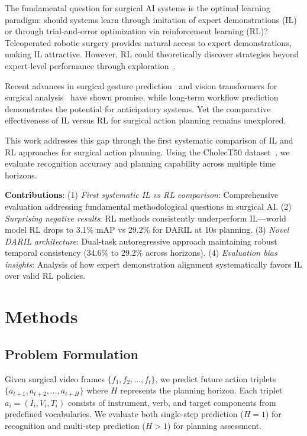 \documentclass[runningheads]{llncs}
\begin{document}
The fundamental question for surgical AI systems is the optimal learning paradigm: should systems learn through imitation of expert demonstrations (IL) or through trial-and-error optimization via reinforcement learning (RL)? Teleoperated robotic surgery provides natural access to expert demonstrations, making IL attractive. However, RL could theoretically discover strategies beyond expert-level performance through exploration~\cite{liu2024surgical}.

Recent advances in surgical gesture prediction~\cite{shi2022recognition,weerasinghe2024multimodal} and vision transformers for surgical analysis~\cite{wagner2023vision,liu2023skit} have shown promise, while long-term workflow prediction~\cite{boels2025swag} demonstrates the potential for anticipatory systems. Yet the comparative effectiveness of IL versus RL for surgical action planning remains unexplored.

This work addresses this gap through the first systematic comparison of IL and RL approaches for surgical action planning. Using the CholecT50 dataset~\cite{nwoye2022cholect50}, we evaluate recognition accuracy and planning capability across multiple time horizons.

\textbf{Contributions}: (1) \textit{First systematic IL vs RL comparison}: Comprehensive evaluation addressing fundamental methodological questions in surgical AI. (2) \textit{Surprising negative results}: RL methods consistently underperform IL—world model RL drops to 3.1\% mAP vs 29.2\% for DARIL at 10s planning. (3) \textit{Novel DARIL architecture}: Dual-task autoregressive approach maintaining robust temporal consistency (34.6\% to 29.2\% across horizons). (4) \textit{Evaluation bias insights}: Analysis of how expert demonstration alignment systematically favors IL over valid RL policies.

\section{Methods}

\subsection{Problem Formulation}

Given surgical video frames $\{f_1, f_2, ..., f_t\}$, we predict future action triplets $\{a_{t+1}, a_{t+2}, ..., a_{t+H}\}$ where $H$ represents the planning horizon. Each triplet $a_i = (I_i, V_i, T_i)$ consists of instrument, verb, and target components from predefined vocabularies. We evaluate both single-step prediction ($H=1$) for recognition and multi-step prediction ($H>1$) for planning assessment.
\end{document}
